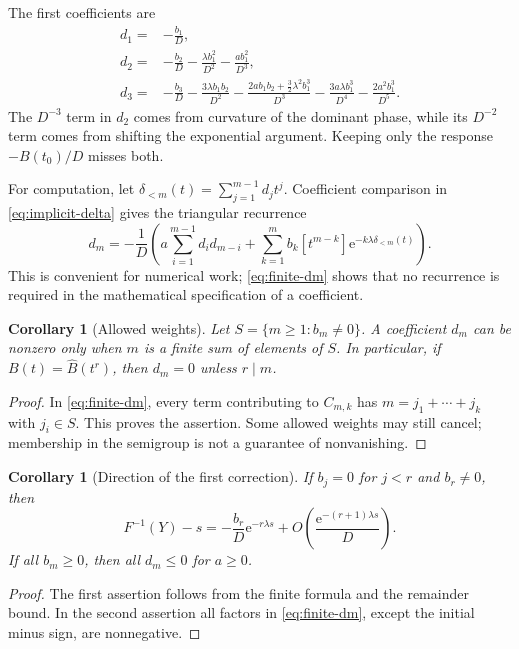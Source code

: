 \documentclass[11pt]{article}
\numberwithin{equation}{section}
\newtheorem{corollary}[theorem]{Corollary}
\theoremstyle{definition}
\newcommand{\coef}[2]{[#1^{#2}]}
\newcommand{\ee}{\mathrm e}
\begin{document}
The first coefficients are
\begin{align}
 d_1={}&-\frac{b_1}{D},\label{eq:d1}\\
 d_2={}&-\frac{b_2}{D}-\frac{\lambda b_1^2}{D^2}
                   -\frac{a b_1^2}{D^3},\label{eq:d2}\\
 d_3={}&-\frac{b_3}{D}-\frac{3\lambda b_1b_2}{D^2}
 -\frac{2a b_1b_2+\tfrac32\lambda^2b_1^3}{D^3}
 -\frac{3a\lambda b_1^3}{D^4}
 -\frac{2a^2b_1^3}{D^5}.\label{eq:d3}
\end{align}
The $D^{-3}$ term in $d_2$ comes from curvature of the dominant phase, while its $D^{-2}$ term comes from shifting the exponential argument. Keeping only the response $-B(t_0)/D$ misses both.

For computation, let $\delta_{<m}(t)=\sum_{j=1}^{m-1}d_jt^j$. Coefficient comparison in \eqref{eq:implicit-delta} gives the triangular recurrence
\begin{equation}\label{eq:dm-recurrence}
 d_m=-\frac1D\left(
 a\sum_{i=1}^{m-1}d_i d_{m-i}
 +\sum_{k=1}^m b_k\coef{t}{m-k}
     \ee^{-k\lambda\delta_{<m}(t)}\right).
\end{equation}
This is convenient for numerical work; \eqref{eq:finite-dm} shows that no recurrence is required in the mathematical specification of a coefficient.

\begin{corollary}[Allowed weights]\label{cor:support}
Let $S=\{m\ge1:b_m\ne0\}$. A coefficient $d_m$ can be nonzero only when $m$ is a finite sum of elements of $S$. In particular, if $B(t)=\widehat B(t^r)$, then $d_m=0$ unless $r\mid m$.
\end{corollary}
\begin{proof}
In \eqref{eq:finite-dm}, every term contributing to $C_{m,k}$ has $m=j_1+\cdots+j_k$ with $j_i\in S$. This proves the assertion. Some allowed weights may still cancel; membership in the semigroup is not a guarantee of nonvanishing.
\end{proof}

\begin{corollary}[Direction of the first correction]\label{cor:sign}
If $b_j=0$ for $j<r$ and $b_r\ne0$, then
\[
 F^{-1}(Y)-s=-\frac{b_r}{D}\ee^{-r\lambda s}
 +O\!\left(\frac{\ee^{-(r+1)\lambda s}}{D}\right).
\]
If all $b_m\ge0$, then all $d_m\le0$ for $a\ge0$.
\end{corollary}
\begin{proof}
The first assertion follows from the finite formula and the remainder bound. In the second assertion all factors in \eqref{eq:finite-dm}, except the initial minus sign, are nonnegative.
\end{proof}
\end{document}

